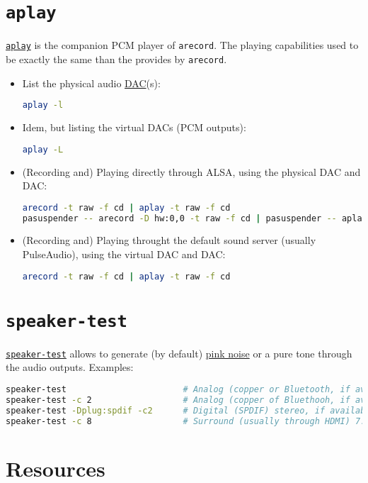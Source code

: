 \section{\texttt{aplay}}
\texttt{\href{https://linux.die.net/man/1/aplay}{aplay}} is the
companion PCM player of \texttt{arecord}. The playing capabilities
used to be exactly the same than the provides by \texttt{arecord}.

\begin{itemize}

\item List the physical audio
  \href{https://en.wikipedia.org/wiki/Digital-to-analog_converter}{DAC}(s):
\begin{lstlisting}[language=Bash]
aplay -l      
\end{lstlisting}

\item Idem, but listing the virtual DACs (PCM outputs):
\begin{lstlisting}[language=Bash]
aplay -L
\end{lstlisting}

\item (Recording and) Playing directly through ALSA, using the physical DAC and DAC:
\begin{lstlisting}[language=Bash]
arecord -t raw -f cd | aplay -t raw -f cd
pasuspender -- arecord -D hw:0,0 -t raw -f cd | pasuspender -- aplay -D hw:0,0 -t raw -f cd
\end{lstlisting}

\item (Recording and) Playing throught the default sound server (usually PulseAudio), using the virtual DAC and DAC:
\begin{lstlisting}[language=Bash]
arecord -t raw -f cd | aplay -t raw -f cd
\end{lstlisting}
\end{itemize}

\section{\texttt{speaker-test}}
\texttt{\href{https://linux.die.net/man/1/speaker-test}{speaker-test}} allows to generate (by default) \href{https://en.wikipedia.org/wiki/Pink_noise}{pink noise} or a pure tone through the audio outputs. Examples:
\begin{lstlisting}[language=Bash]
speaker-test                       # Analog (copper or Bluetooth, if available) mono
speaker-test -c 2                  # Analog (copper of Bluethooh, if available) stereo
speaker-test -Dplug:spdif -c2      # Digital (SPDIF) stereo, if available
speaker-test -c 8                  # Surround (usually through HDMI) 7.1, if available
\end{lstlisting}

\section{Resources}


